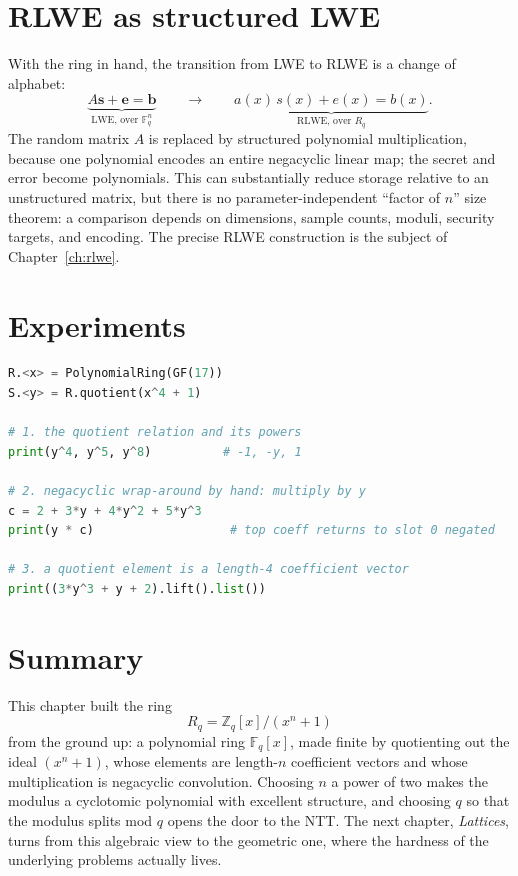 \section{RLWE as structured LWE}
With the ring in hand, the transition from LWE to RLWE is a change of alphabet:
\[
\underbrace{A\mathbf{s}+\mathbf{e}=\mathbf{b}}_{\text{LWE, over } \mathbb{F}_q^n}
\qquad\longrightarrow\qquad
\underbrace{a(x)\,s(x)+e(x)=b(x)}_{\text{RLWE, over } R_q}.
\]
The random matrix $A$ is replaced by structured polynomial multiplication, because one polynomial encodes an entire negacyclic linear map; the secret and error become polynomials. This can substantially reduce storage relative to an unstructured matrix, but there is no parameter-independent ``factor of $n$'' size theorem: a comparison depends on dimensions, sample counts, moduli, security targets, and encoding. The precise RLWE construction is the subject of Chapter~\ref{ch:rlwe}.

\section{Experiments}

\begin{lstlisting}[language=Python]
R.<x> = PolynomialRing(GF(17))
S.<y> = R.quotient(x^4 + 1)

# 1. the quotient relation and its powers
print(y^4, y^5, y^8)          # -1, -y, 1

# 2. negacyclic wrap-around by hand: multiply by y
c = 2 + 3*y + 4*y^2 + 5*y^3
print(y * c)                   # top coeff returns to slot 0 negated

# 3. a quotient element is a length-4 coefficient vector
print((3*y^3 + y + 2).lift().list())
\end{lstlisting}

\section{Summary}
This chapter built the ring
\[
R_q = \mathbb{Z}_q[x]/(x^n+1)
\]
from the ground up: a polynomial ring $\mathbb{F}_q[x]$, made finite by quotienting out the ideal $(x^n+1)$, whose elements are length-$n$ coefficient vectors and whose multiplication is negacyclic convolution. Choosing $n$ a power of two makes the modulus a cyclotomic polynomial with excellent structure, and choosing $q$ so that the modulus splits mod $q$ opens the door to the NTT. The next chapter, \emph{Lattices}, turns from this algebraic view to the geometric one, where the hardness of the underlying problems actually lives.

\printbibliography[heading=chapterrefs]
